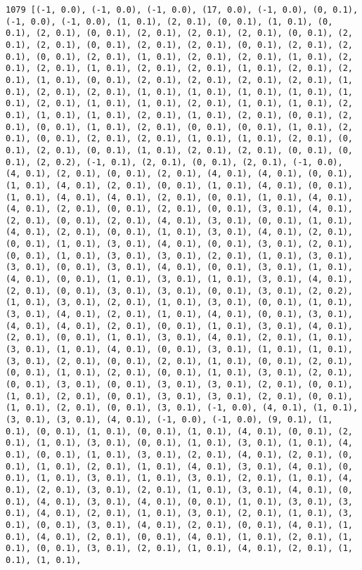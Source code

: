 \documentclass[11pt]{article}
\begin{document}
\begin{Verbatim}[commandchars=\\\{\}]
1079 [(-1, 0.0), (-1, 0.0), (-1, 0.0), (17, 0.0), (-1, 0.0), (0, 0.1), (-1, 0.0), (-1, 0.0), (1, 0.1), (2, 0.1), (0, 0.1), (1, 0.1), (0, 0.1), (2, 0.1), (0, 0.1), (2, 0.1), (2, 0.1), (2, 0.1), (0, 0.1), (2, 0.1), (2, 0.1), (0, 0.1), (2, 0.1), (2, 0.1), (0, 0.1), (2, 0.1), (2, 0.1), (0, 0.1), (2, 0.1), (1, 0.1), (2, 0.1), (2, 0.1), (1, 0.1), (2, 0.1), (2, 0.1), (1, 0.1), (2, 0.1), (2, 0.1), (1, 0.1), (2, 0.1), (2, 0.1), (1, 0.1), (0, 0.1), (2, 0.1), (2, 0.1), (2, 0.1), (2, 0.1), (1, 0.1), (2, 0.1), (2, 0.1), (1, 0.1), (1, 0.1), (1, 0.1), (1, 0.1), (1, 0.1), (2, 0.1), (1, 0.1), (1, 0.1), (2, 0.1), (1, 0.1), (1, 0.1), (2, 0.1), (1, 0.1), (1, 0.1), (2, 0.1), (1, 0.1), (2, 0.1), (0, 0.1), (2, 0.1), (0, 0.1), (1, 0.1), (2, 0.1), (0, 0.1), (0, 0.1), (1, 0.1), (2, 0.1), (0, 0.1), (2, 0.1), (2, 0.1), (1, 0.1), (1, 0.1), (2, 0.1), (0, 0.1), (2, 0.1), (0, 0.1), (1, 0.1), (2, 0.1), (2, 0.1), (0, 0.1), (0, 0.1), (2, 0.2), (-1, 0.1), (2, 0.1), (0, 0.1), (2, 0.1), (-1, 0.0), (4, 0.1), (2, 0.1), (0, 0.1), (2, 0.1), (4, 0.1), (4, 0.1), (0, 0.1), (1, 0.1), (4, 0.1), (2, 0.1), (0, 0.1), (1, 0.1), (4, 0.1), (0, 0.1), (1, 0.1), (4, 0.1), (4, 0.1), (2, 0.1), (0, 0.1), (1, 0.1), (4, 0.1), (4, 0.1), (2, 0.1), (0, 0.1), (2, 0.1), (0, 0.1), (3, 0.1), (4, 0.1), (2, 0.1), (0, 0.1), (2, 0.1), (4, 0.1), (3, 0.1), (0, 0.1), (1, 0.1), (4, 0.1), (2, 0.1), (0, 0.1), (1, 0.1), (3, 0.1), (4, 0.1), (2, 0.1), (0, 0.1), (1, 0.1), (3, 0.1), (4, 0.1), (0, 0.1), (3, 0.1), (2, 0.1), (0, 0.1), (1, 0.1), (3, 0.1), (3, 0.1), (2, 0.1), (1, 0.1), (3, 0.1), (3, 0.1), (0, 0.1), (3, 0.1), (4, 0.1), (0, 0.1), (3, 0.1), (1, 0.1), (4, 0.1), (0, 0.1), (1, 0.1), (3, 0.1), (1, 0.1), (3, 0.1), (4, 0.1), (2, 0.1), (0, 0.1), (3, 0.1), (3, 0.1), (0, 0.1), (3, 0.1), (2, 0.2), (1, 0.1), (3, 0.1), (2, 0.1), (1, 0.1), (3, 0.1), (0, 0.1), (1, 0.1), (3, 0.1), (4, 0.1), (2, 0.1), (1, 0.1), (4, 0.1), (0, 0.1), (3, 0.1), (4, 0.1), (4, 0.1), (2, 0.1), (0, 0.1), (1, 0.1), (3, 0.1), (4, 0.1), (2, 0.1), (0, 0.1), (1, 0.1), (3, 0.1), (4, 0.1), (2, 0.1), (1, 0.1), (3, 0.1), (1, 0.1), (4, 0.1), (0, 0.1), (3, 0.1), (1, 0.1), (1, 0.1), (3, 0.1), (2, 0.1), (0, 0.1), (2, 0.1), (1, 0.1), (0, 0.1), (2, 0.1), (0, 0.1), (1, 0.1), (2, 0.1), (0, 0.1), (1, 0.1), (3, 0.1), (2, 0.1), (0, 0.1), (3, 0.1), (0, 0.1), (3, 0.1), (3, 0.1), (2, 0.1), (0, 0.1), (1, 0.1), (2, 0.1), (0, 0.1), (3, 0.1), (3, 0.1), (2, 0.1), (0, 0.1), (1, 0.1), (2, 0.1), (0, 0.1), (3, 0.1), (-1, 0.0), (4, 0.1), (1, 0.1), (3, 0.1), (3, 0.1), (4, 0.1), (-1, 0.0), (-1, 0.0), (9, 0.1), (1, 0.1), (0, 0.1), (1, 0.1), (0, 0.1), (1, 0.1), (4, 0.1), (0, 0.1), (2, 0.1), (1, 0.1), (3, 0.1), (0, 0.1), (1, 0.1), (3, 0.1), (1, 0.1), (4, 0.1), (0, 0.1), (1, 0.1), (3, 0.1), (2, 0.1), (4, 0.1), (2, 0.1), (0, 0.1), (1, 0.1), (2, 0.1), (1, 0.1), (4, 0.1), (3, 0.1), (4, 0.1), (0, 0.1), (1, 0.1), (3, 0.1), (1, 0.1), (3, 0.1), (2, 0.1), (1, 0.1), (4, 0.1), (2, 0.1), (3, 0.1), (2, 0.1), (1, 0.1), (3, 0.1), (4, 0.1), (0, 0.1), (4, 0.1), (3, 0.1), (4, 0.1), (0, 0.1), (1, 0.1), (3, 0.1), (3, 0.1), (4, 0.1), (2, 0.1), (1, 0.1), (3, 0.1), (2, 0.1), (1, 0.1), (3, 0.1), (0, 0.1), (3, 0.1), (4, 0.1), (2, 0.1), (0, 0.1), (4, 0.1), (1, 0.1), (4, 0.1), (2, 0.1), (0, 0.1), (4, 0.1), (1, 0.1), (2, 0.1), (1, 0.1), (0, 0.1), (3, 0.1), (2, 0.1), (1, 0.1), (4, 0.1), (2, 0.1), (1, 0.1), (1, 0.1), 
\end{Verbatim}
\end{document}
